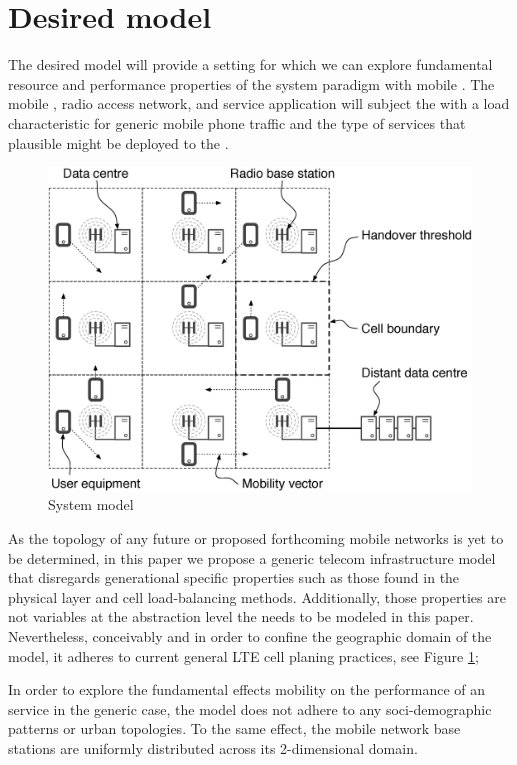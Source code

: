 \section{Desired model}

The desired model will provide a setting for which we can explore fundamental resource and performance properties of the \xcloud{} system paradigm with mobile \ues{}. The mobile \ues{}, radio access network, and service application will subject the \dcs{} with a load characteristic for generic mobile phone traffic and the type of services that plausible might be deployed to the \xcloud{}.

\begin{figure}[tb]
	\centering
	\includegraphics[width=\linewidth]{desiard_model.eps} 
	\caption{System model}
	\label{fig:system_model}
\end{figure}

As the topology of any future \xcloud{} or proposed forthcoming mobile networks is yet to be determined, in this paper we propose a generic telecom infrastructure model that disregards generational specific properties such as those found in the physical layer and cell load-balancing methods. Additionally, those properties are not variables at the abstraction level the \xcloud needs to be modeled in this paper. Nevertheless, conceivably and in order to confine the geographic domain of the model, it adheres to current general LTE cell planing practices, see Figure \ref{fig:system_model};

In order to explore the fundamental effects mobility on the performance of an \xcloud service in the generic case, the model does not adhere to any soci-demographic patterns or urban topologies. To the same effect, the mobile network base stations are uniformly distributed across its 2-dimensional domain.


